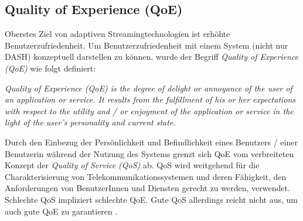 \documentclass[paper = a4, fontsize = 12pt, parskip = half]{scrartcl} %
\begin{document}
\subsection{Quality of Experience (QoE)}
Oberstes Ziel von adaptiven Streamingtechnologien ist erhöhte Benutzerzufriedenheit. Um Benutzerzufriedenheit mit einem System (nicht nur DASH) konzeptuell darstellen zu können, wurde der Begriff \textit{Quality of Experience (QoE)} wie folgt definiert:

\glqq \textit{Quality of Experience (QoE) is the degree of delight or annoyance of the user of an application or service. It results from the fulfillment of his or her expectations with respect to the utility and / or enjoyment of the application or service in the light of the user’s personality and current state.}\grqq \cite{brunnstrom_qualinet_2013}

Durch den Einbezug der Persönlichkeit und Befindlichkeit eines Benutzers / einer Benutzerin während der Nutzung des Systems grenzt sich QoE vom verbreiteten Konzept der \textit{Quality of Service (QoS)} ab. QoS wird weitgehend für die Charakterisierung von Telekommunikationssystemen und deren Fähigkeit, den Anforderungen von BenutzerInnen und Diensten gerecht zu werden, verwendet. Schlechte QoS impliziert schlechte QoE. Gute QoS allerdings reicht nicht aus, um auch gute QoE zu garantieren \cite{brunnstrom_qualinet_2013}.
\end{document}
